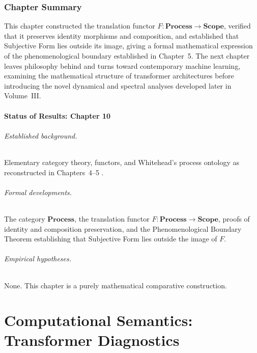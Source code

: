 \documentclass[11pt,twoside,openright]{book}
\numberwithin{equation}{chapter}
\theoremstyle{definition}
\theoremstyle{plain}
\theoremstyle{remark}
\theoremstyle{definition}
\newcommand{\CatScope}{\mathbf{Scope}}
\newcommand{\CatProcess}{\mathbf{Process}}
\begin{document}
\section{Chapter Summary}

This chapter constructed the translation functor $F:\CatProcess\to\CatScope$,
verified that it preserves identity morphisms and composition, and
established that Subjective Form lies outside its image, giving a formal
mathematical expression of the phenomenological boundary established in
Chapter~5. The next chapter leaves philosophy behind and turns toward
contemporary machine learning, examining the mathematical structure of
transformer architectures before introducing the novel dynamical and
spectral analyses developed later in Volume~III.

\subsection*{Status of Results: Chapter 10}

\paragraph{Established background.} Elementary category theory, functors,
and Whitehead's process ontology as reconstructed in Chapters~4--5
\cite{MacLane1998,Awodey2010,Whitehead1929}.

\paragraph{Formal developments.} The category $\CatProcess$, the
translation functor $F:\CatProcess\to\CatScope$, proofs of identity and
composition preservation, and the Phenomenological Boundary Theorem
establishing that Subjective Form lies outside the image of $F$.

\paragraph{Empirical hypotheses.} None. This chapter is a purely
mathematical comparative construction.

\part{Computational Semantics: Transformer Diagnostics}
\end{document}
